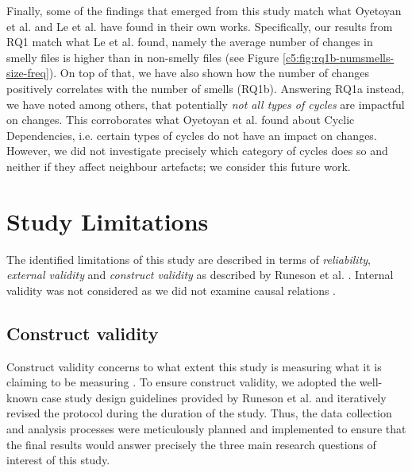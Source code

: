 Finally, some of the findings that emerged from this study match what Oyetoyan et al. \cite{Oyetoyan2015} and Le et al. \cite{Le2018} have found in their own works.
Specifically, our results from RQ1 match what Le et al. \cite{Le2018} found, namely the average number of changes in smelly files is higher than in non-smelly files (see Figure \ref{c5:fig:rq1b-numsmells-size-freq}). On top of that, we have also shown how the number of changes positively correlates with the number of smells (RQ1b).
Answering RQ1a instead, we have noted among others, that potentially \emph{not all types of cycles} are impactful on changes. This corroborates what Oyetoyan et al. \cite{Oyetoyan2015} found about Cyclic Dependencies, i.e. certain types of cycles do not have an impact on changes. However, we did not investigate precisely which category of cycles does so and neither if they affect neighbour artefacts; we consider this future work.

\section{Study Limitations}\label{c5:sec:limitations}
The identified limitations of this study are described in terms of \emph{reliability}, \emph{external validity} and \emph{construct validity} as described by Runeson et al. \cite{Runeson2012}. Internal validity was not considered as we did not examine causal relations \cite{Runeson2012}. %

\subsection{Construct validity}
Construct validity concerns to what extent this study is measuring what it is claiming to be measuring \cite{Runeson2012}.
To ensure construct validity, we adopted the well-known case study design guidelines provided by Runeson et al. \cite{Runeson2012} and iteratively revised the protocol during the duration of the study.
Thus, the data collection and analysis processes were meticulously planned and implemented to ensure that the final results would answer precisely the three main research questions of interest of this study.

